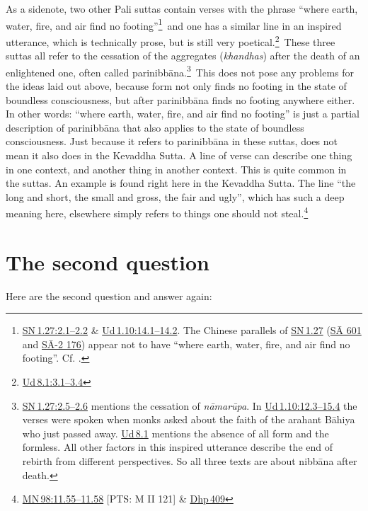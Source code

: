 \documentclass[10pt, openany]{book}
\begin{document}
As a sidenote, two other Pali suttas contain verses with the phrase “where earth, water, fire, and air find no footing”\footnote {\href{https://suttacentral.net/sn1.27/en/sujato\#2.1}{SN 1.27:2.1–2.2} \& \href{https://suttacentral.net/ud1.10/en/sujato\#14.1}{Ud 1.10:14.1–14.2}. The Chinese parallels of \href{https://suttacentral.net/sn1.27/en/sujato}{SN 1.27} (\href{https://suttacentral.net/sa601}{SĀ 601} and \href{https://suttacentral.net/sa-2.176}{SĀ-2 176}) appear not to have “where earth, water, fire, and air find no footing”. Cf. \cite{Sujato 2011b}.} and one has a similar line in an inspired utterance, which is technically prose, but is still very poetical.\footnote {\href{https://suttacentral.net/ud8.1/en/sujato\#3.1}{Ud 8.1:3.1–3.4}} These three suttas all refer to the cessation of the aggregates (\textit{khandhas}) after the death of an enlightened one, often called parinibbāna.\footnote {\href{https://suttacentral.net/sn1.27/en/sujato\#2.5}{SN 1.27:2.5–2.6} mentions the cessation of \textit{nāmarūpa}. In \href{https://suttacentral.net/ud1.10/en/sujato\#12.3}{Ud 1.10:12.3–15.4} the verses were spoken when monks asked about the faith of the arahant Bāhiya who just passed away. \href{https://suttacentral.net/ud8.1/en/sujato}{Ud 8.1} mentions the absence of all form and the formless. All other factors in this inspired utterance describe the end of rebirth from different perspectives. So all three texts are about nibbāna after death.} This does not pose any problems for the ideas laid out above, because form not only finds no footing in the state of boundless consciousness, but after parinibbāna finds no footing anywhere either. In other words: “where earth, water, fire, and air find no footing” is just a partial description of parinibbāna that also applies to the state of boundless consciousness. Just because it refers to parinibbāna in these suttas, does not mean it also does in the Kevaddha Sutta. A line of verse can describe one thing in one context, and another thing in another context. This is quite common in the suttas. An example is found right here in the Kevaddha Sutta. The line “the long and short, the small and gross, the fair and ugly”, which has such a deep meaning here, elsewhere simply refers to things one should not steal.\footnote {\href{https://suttacentral.net/mn98/en/sujato\#11.55}{MN 98:11.55–11.58} [PTS: M II 121] \& \href{https://suttacentral.net/dhp409/en/sujato}{Dhp 409}}




\section{The second question}
Here are the second question and answer again:
\end{document}
